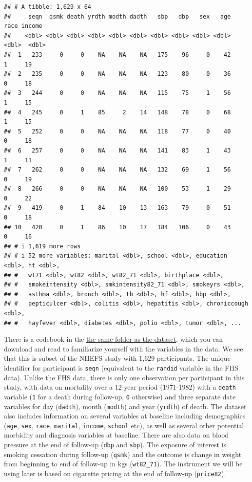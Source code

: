 \documentclass[
]{book}
\begin{document}
\begin{verbatim}
## # A tibble: 1,629 x 64
##     seqn  qsmk death yrdth modth dadth   sbp   dbp   sex   age  race income
##    <dbl> <dbl> <dbl> <dbl> <dbl> <dbl> <dbl> <dbl> <dbl> <dbl> <dbl>  <dbl>
##  1   233     0     0    NA    NA    NA   175    96     0    42     1     19
##  2   235     0     0    NA    NA    NA   123    80     0    36     0     18
##  3   244     0     0    NA    NA    NA   115    75     1    56     1     15
##  4   245     0     1    85     2    14   148    78     0    68     1     15
##  5   252     0     0    NA    NA    NA   118    77     0    40     0     18
##  6   257     0     0    NA    NA    NA   141    83     1    43     1     11
##  7   262     0     0    NA    NA    NA   132    69     1    56     0     19
##  8   266     0     0    NA    NA    NA   100    53     1    29     0     22
##  9   419     0     1    84    10    13   163    79     0    51     0     18
## 10   420     0     1    86    10    17   184   106     0    43     0     16
## # i 1,619 more rows
## # i 52 more variables: marital <dbl>, school <dbl>, education <dbl>, ht <dbl>,
## #   wt71 <dbl>, wt82 <dbl>, wt82_71 <dbl>, birthplace <dbl>,
## #   smokeintensity <dbl>, smkintensity82_71 <dbl>, smokeyrs <dbl>,
## #   asthma <dbl>, bronch <dbl>, tb <dbl>, hf <dbl>, hbp <dbl>,
## #   pepticulcer <dbl>, colitis <dbl>, hepatitis <dbl>, chroniccough <dbl>,
## #   hayfever <dbl>, diabetes <dbl>, polio <dbl>, tumor <dbl>, ...
\end{verbatim}

There is a codebook in the \href{https://github.com/geanders/adv_epi_analysis/tree/master/data}{the same folder as the dataset}, which you can download and read to familiarize yourself with the variables in the data.
We see that this is subset of the NHEFS study with 1,629 participants. The unique identifier for participant is \texttt{seqn} (equivalent to the \texttt{randid} variable in the FHS data). Unlike the FHS data, there is only one observation per participant in this study, with data on mortality over a 12-year period (1971-1982) with a \texttt{death} variable (\texttt{1} for a death during follow-up, \texttt{0} otherwise) and three separate date variables for day (\texttt{dadth}), month (\texttt{modth}) and year (\texttt{yrdth}) of death. The dataset also includes information on several variables at baseline including demographics (\texttt{age}, \texttt{sex}, \texttt{race}, \texttt{marital}, \texttt{income}, \texttt{school} etc), as well as several other potential morbidity and diagnosis variables at baseline. There are also data on blood pressure at the end of follow-up (\texttt{dbp} and \texttt{sbp}). The exposure of interest is smoking cessation during follow-up (\texttt{qsmk}) and the outcome is change in weight from beginning to end of follow-up in kgs (\texttt{wt82\_71}). The instrument we will be using later is based on cigarette pricing at the end of follow-up (\texttt{price82}).
\end{document}
